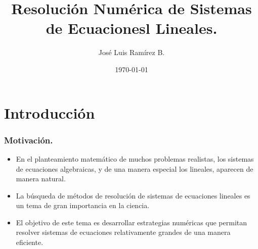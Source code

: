 \documentclass{beamer}
\title{Resoluci\'on Num\'erica de Sistemas de Ecuacionesl Lineales.}
\author{Jos\'e Luis Ram\'irez B.}
\date{\today}
\begin{document}
\frame{\titlepage}

\frame{\tableofcontents}

\section{Introducci\'on}
\begin{frame}[fragile]
  \frametitle{Motivaci\'on.} 
  \begin{itemize}
    \item En el planteamiento matem\'atico de muchos problemas realistas, los sistemas de ecuaciones algebraicas, y de una manera especial los lineales, aparecen de manera natural.
    \item<2-> La b\'usqueda de m\'etodos de resoluci\'on de sistemas de ecuaciones lineales es un tema de gran importancia en la ciencia.
    \item<3-> El objetivo de este tema es desarrollar estrategias num\'ericas que permitan resolver sistemas de ecuaciones relativamente grandes de una manera eficiente.
  \end{itemize}    
\end{frame}



 
 
 
\end{document}
